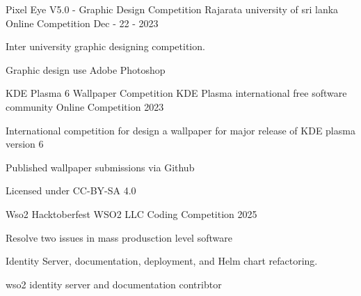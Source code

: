

\begin{cventries}

  \cventry
    {Pixel Eye V5.0 - Graphic Design Competition} %
    {Rajarata university of sri lanka} %
    {Online Competition} %
    {Dec - 22 - 2023} %
    {
      \begin{cvitems} %
        \item {Inter university graphic designing competition.}
        \item {Graphic design use Adobe Photoshop}
      \end{cvitems}
    }

  \cventry
    {KDE Plasma 6 Wallpaper Competition} %
    {KDE Plasma international free software community} %
    {Online Competition} %
    {2023} %
    {
      \begin{cvitems} %
        \item {International competition for design a wallpaper for major release of KDE plasma version 6}
        \item {Published wallpaper submissions via Github}
        \item {Licensed under CC-BY-SA 4.0}
      \end{cvitems}
    }

  \cventry
    {Wso2 Hacktoberfest} %
    {WSO2 LLC} %
    {Coding Competition} %
    {2025} %
    {
      \begin{cvitems} %
        \item {Resolve two issues in mass produsction level software}
        \item {Identity Server, documentation, deployment, and Helm chart refactoring.}
        \item {wso2 identity server and documentation contribtor}
      \end{cvitems}
    }

\end{cventries}
